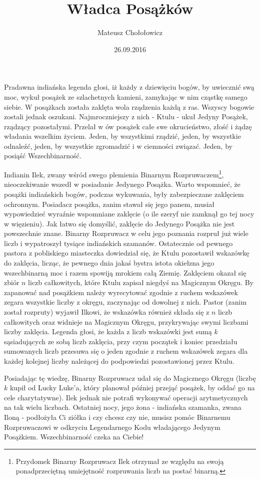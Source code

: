 \documentclass[zad,zawodnik,utf8]{sinol}
\title{Władca Posążków}
\author{Mateusz Chołołowicz} %
\date{26.09.2016}
\begin{document}
  \begin{tasktext}%
Pradawna indiańska legenda głosi, iż każdy z dziewięciu bogów, by uwiecznić swą moc, wykuł posążek ze szlachetnych kamieni, zamykając w nim cząstkę samego siebie.
W posążkach została zaklęta wola rządzenia każdą z ras. Wszyscy bogowie zostali jednak oszukani. Najmroczniejszy z nich - Ktulu - ukuł Jedyny Posążek, rządzący pozostałymi.
Przelał w ów posążek całe swe okrucieństwo, złość i żądzę władania wszelkim życiem. Jeden, by wszystkimi rządzić, jeden, by wszystkie odnaleźć, jeden, by wszystkie 
zgromadzić i w ciemności związać. Jeden, by posiąść Wszechbinarność. 

Indianin Ilek, zwany wśród swego plemienia Binarnym Rozpruwaczem\footnote{Przydomek Binarny Rozpruwacz Ilek otrzymał ze względu na swoją ponadprzeciętną umiejętność 
rozpruwania liczb na postać binarną.},
nieoczekiwanie wszedł w posiadanie Jedynego Posążka.
Warto wspomnieć, że posążki indiańskich bogów, podczas wykuwania, były zabezpieczane zaklęciem ochronnym. Posiadacz posążka, zanim stawał się jego panem,
musiał wypowiedzieć wyraźnie wspomniane zaklęcie (o ile szeryf nie zamknął go tej nocy w więzieniu). 
Jak łatwo się domyślić, zaklęcie do Jedynego Posążka nie jest powszechnie znane. Binarny Rozpruwacz w celu jego poznania rozpruł już wiele liczb i wypatroszył tysiące
indiańskich szamanów. Ostatecznie od pewnego pastora z pobliskiego miasteczka dowiedział się, że Ktulu pozostawił wskazówkę do zaklęcia, licząc, że pewnego dnia
jakaś bystra istota okiełzna jego wszechbinarną moc i razem spowiją mrokiem całą Ziemię. Zaklęciem okazał się zbiór $n$ liczb całkowitych, które Ktulu zapisał niegdyś
na Magicznym Okręgu. By zapanować nad posążkiem należy wyrecytować zgodnie z ruchem wskazówek zegara wszystkie liczby z okręgu, zaczynając od dowolnej z nich.
Pastor (zanim został rozpruty) wyjawił Ilkowi, że wskazówka również składa się z $n$ liczb całkowitych oraz widnieje na Magicznym Okręgu, 
przykrywając swymi liczbami liczby zaklęcia. Legenda głosi, że każda z liczb wskazówki jest sumą $k$ sąsiadujących ze sobą liczb zaklęcia, 
przy czym początek i koniec przedziału sumowanych liczb przesuwa się o jeden zgodnie z ruchem wskazówek zegara dla każdej kolejnej liczby należącej do
podpowiedzi pozostawionej przez Ktulu. 

Posiadając tę wiedzę, Binarny Rozpruwacz udał się do Magicznego Okręgu (liczbę $k$ kupił od Lucky Luke'a, który planował później przejąć posążek, by oddać go na cele charytatywne). 
Ilek jednak nie potrafi wykonywać operacji arytmetycznych na tak wielu liczbach. Ostatniej nocy, jego żona - indiańska szamanka, zwana Iloną - podłożyła Ci ziółka 
i czy chcesz czy nie, musisz pomóc Binarnemu Rozpruwaczowi w odkryciu Legendarnego Kodu władającego Jedynym Posążkiem. Wszechbinarność czeka na Ciebie!


\end{tasktext}
\end{document}
